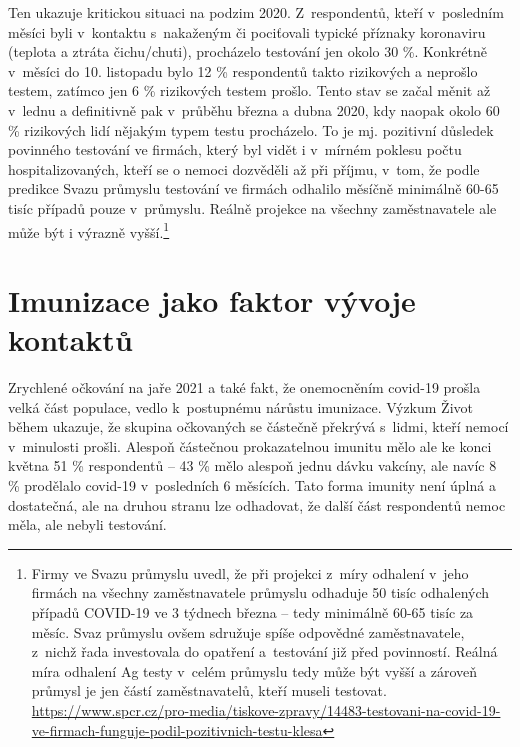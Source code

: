 Ten ukazuje kritickou situaci na podzim 2020. Z respondentů, kteří v posledním měsíci byli v kontaktu s nakaženým či pociťovali typické příznaky koronaviru (teplota a ztráta čichu/chuti), procházelo testování jen okolo 30 \%. Konkrétně v měsíci do 10. listopadu bylo 12 \% respondentů takto rizikových a neprošlo testem, zatímco jen 6 \% rizikových testem prošlo. Tento stav se začal měnit až v lednu a definitivně pak v průběhu března a dubna 2020, kdy naopak okolo 60 \% rizikových lidí nějakým typem testu procházelo. To je mj. pozitivní důsledek
povinného testování ve firmách, který byl vidět i v mírném poklesu počtu hospitalizovaných, kteří se o nemoci dozvěděli až při příjmu, v tom, že podle predikce Svazu průmyslu testování ve firmách odhalilo měsíčně minimálně 60-65 tisíc případů pouze v průmyslu. Reálně projekce na všechny zaměstnavatele ale může být i výrazně vyšší.\footnote{Firmy ve Svazu průmyslu uvedl, že při projekci z míry odhalení v jeho firmách na všechny zaměstnavatele průmyslu odhaduje 50 tisíc odhalených případů COVID-19 ve 3 týdnech března – tedy minimálně 60-65 tisíc za měsíc. Svaz průmyslu ovšem sdružuje spíše odpovědné zaměstnavatele, z nichž řada investovala do opatření a testování již před povinností. Reálná míra odhalení Ag testy v celém průmyslu tedy může být vyšší a zároveň průmysl je jen částí zaměstnavatelů, kteří museli testovat. \url{https://www.spcr.cz/pro-media/tiskove-zpravy/14483-testovani-na-covid-19-ve-firmach-funguje-podil-pozitivnich-testu-klesa}}

\section*{Imunizace jako faktor vývoje kontaktů}

Zrychlené očkování na jaře 2021 a také fakt, že onemocněním covid-19 prošla velká část populace, vedlo k postupnému nárůstu imunizace. Výzkum Život během ukazuje, že skupina očkovaných se částečně překrývá s lidmi, kteří nemocí v minulosti prošli. Alespoň částečnou prokazatelnou imunitu mělo ale ke konci května 51 \% respondentů – 43 \% mělo alespoň jednu dávku vakcíny, ale navíc 8 \% prodělalo covid-19 v posledních 6 měsících. Tato forma imunity není úplná a dostatečná, ale na druhou stranu lze odhadovat, že další část respondentů nemoc měla, ale nebyli testování.

